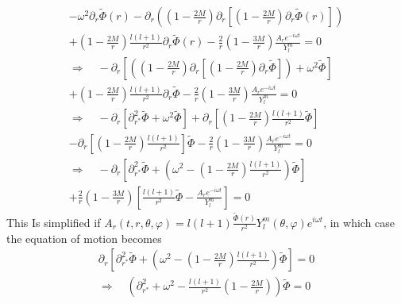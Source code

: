 \documentclass[12pt]{article}
\def\nn{\nonumber}
\begin{document}
\begin{gather}
-
\omega^{2}
\partial_{r}
\tilde{\Phi}(r)
-
\partial_{r}
\left(
(1 - \frac{2 M}{r})
\partial_{r} \left[ (1 - \frac{2 M}{r}) \partial_{r}\tilde{\Phi}(r)\right]
\right)
\nn \\
+
(1 - \frac{2 M}{r})
\frac{l (l +1)}{r^{2}}
\partial_{r}
\tilde{\Phi}(r)
-
\frac{2}{r}
\left(
1
-
\frac{3 M}{r}
\right)
\frac{A_{r} e^{- i \omega t}}{Y_{l}^{m}}
=0
\nn \\
\Rightarrow
\quad
-
\partial_{r}
\left[
\left(
(1 - \frac{2 M}{r})
\partial_{r} \left[ (1 - \frac{2 M}{r}) \partial_{r}\tilde{\Phi}\right]
\right)
+
\omega^{2}
\tilde{\Phi}
\right]
\nn \\
+
(1 - \frac{2 M}{r})
\frac{l (l +1)}{r^{2}}
\partial_{r}
\tilde{\Phi}
-
\frac{2}{r}
\left(
1
-
\frac{3 M}{r}
\right)
\frac{A_{r} e^{- i \omega t}}{Y_{l}^{m}}
=0
\nn \\
\Rightarrow
\quad
-
\partial_{r}
\left[
\partial_{r^{\ast}}^{2}
\tilde{\Phi}
+
\omega^{2}
\tilde{\Phi}
\right]
+
\partial_{r}
\left[
(1 - \frac{2 M}{r})
\frac{l (l +1)}{r^{2}}
\tilde{\Phi}
\right]
\nn \\
-
\partial_{r}
\left[
(1 - \frac{2 M}{r})
\frac{l (l +1)}{r^{2}}
\right]
\tilde{\Phi}
-
\frac{2}{r}
\left(
1
-
\frac{3 M}{r}
\right)
\frac{A_{r} e^{- i \omega t}}{Y_{l}^{m}}
=0
\nn \\
\Rightarrow
\quad
-
\partial_{r}
\left[
\partial^{2}_{r^{\ast}}
\tilde{\Phi}
+
\left(
\omega^{2}
-
(1 - \frac{2 M}{r})
\frac{l (l +1)}{r^{2}}
\right)
\tilde{\Phi}
\right]
\nn \\
+
\frac{2}{r}
\left(1 - \frac{3 M}{r}\right)
\left[
\frac{l (l + 1)}{r^{2}}
\tilde{\Phi}
-
\frac{A_{r} e^{- i \omega t}}{Y_{l}^{m}}
\right]
=0
\end{gather}
This Is simplified if $A_{r}(t,r,\theta,\varphi) = l (l + 1) \frac{\tilde{\Phi}(r)}{r^{2}} Y_{l}^{m}(\theta,\varphi) e^{i \omega t}$, in which case the equation of motion becomes
\begin{gather}
\partial_{r}
\left[
\partial^{2}_{r^{\ast}}
\tilde{\Phi}
+
\left(
\omega^{2}
-
(1 - \frac{2 M}{r})
\frac{l (l +1)}{r^{2}}
\right)
\tilde{\Phi}
\right]
=0
\nn \\
\Rightarrow
\quad
\left(
\partial^{2}_{r^{\ast}}
+
\omega^{2}
-
\frac{l (l +1)}{r^{2}}
(1 - \frac{2 M}{r})
\right)
\tilde{\Phi}
=0
\end{gather}
\end{document}
